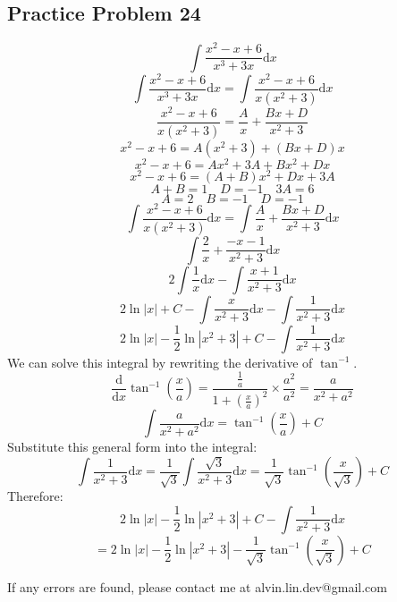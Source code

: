 \documentclass[letterpaper, 12pt]{article}
\renewcommand*{\arctan}{\tan^{-1}}
\newcommand*{\diff}{\mathrm{d}}
\begin{document}
\subsection*{Practice Problem 24}
\[ \int{\frac{x^{2}-x+6}{x^{3}+3x}\diff{x}} \]
\[ \int{\frac{x^{2}-x+6}{x^{3}+3x}\diff{x}} =
   \int{\frac{x^{2}-x+6}{x(x^{2}+3)}\diff{x}} \]
\[ \frac{x^{2}-x+6}{x(x^{2}+3)} = \frac{A}{x}+\frac{Bx+D}{x^{2}+3} \]
\[ x^{2}-x+6 = A(x^{2}+3)+(Bx+D)x \]
\[ x^{2}-x+6 = Ax^{2}+3A+Bx^{2}+Dx \]
\[ x^{2}-x+6 = (A+B)x^{2}+Dx+3A \]
\[ A+B = 1 \quad D = -1 \quad 3A = 6 \]
\[ A = 2 \quad B = -1 \quad D = -1 \]
\[ \int{\frac{x^{2}-x+6}{x(x^{2}+3)}\diff{x}} =
   \int{\frac{A}{x}+\frac{Bx+D}{x^{2}+3}\diff{x}} \]
\[ \int{\frac{2}{x}+\frac{-x-1}{x^{2}+3}\diff{x}} \]
\[ 2\int{\frac{1}{x}\diff{x}}-\int{\frac{x+1}{x^{2}+3}\diff{x}} \]
\[ 2\ln|x|+C-\int{\frac{x}{x^{2}+3}\diff{x}}-\int{\frac{1}{x^{2}+3}\diff{x}} \]
\[ 2\ln|x|-\frac{1}{2}\ln|x^{2}+3|+C-\int{\frac{1}{x^{2}+3}\diff{x}} \]
We can solve this integral by rewriting the derivative of \( \arctan \).
\[ \frac{\diff}{\diff{x}}\arctan(\frac{x}{a}) =
   \frac{\frac{1}{a}}{1+(\frac{x}{a})^{2}}\times\frac{a^{2}}{a^{2}} =
   \frac{a}{x^{2}+a^{2}} \]
\[ \int{\frac{a}{x^{2}+a^{2}}\diff{x}} = \arctan(\frac{x}{a})+C \]
Substitute this general form into the integral:
\[ \int{\frac{1}{x^{2}+3}\diff{x}} =
   \frac{1}{\sqrt{3}}\int{\frac{\sqrt{3}}{x^{2}+3}\diff{x}} =
   \frac{1}{\sqrt{3}}\arctan(\frac{x}{\sqrt{3}})+C \]
Therefore:
\[ 2\ln|x|-\frac{1}{2}\ln|x^{2}+3|+C-\int{\frac{1}{x^{2}+3}\diff{x}} \]
\[ = 2\ln|x|-\frac{1}{2}\ln|x^{2}+3|-
   \frac{1}{\sqrt{3}}\arctan(\frac{x}{\sqrt{3}})+C \]

\begin{center}
  If any errors are found, please contact me at alvin.lin.dev@gmail.com
\end{center}
\end{document}
